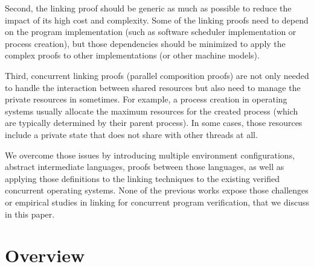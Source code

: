 Second,  
the linking proof should be generic as much as possible to reduce the impact of its high cost and complexity. 
Some of the linking proofs need to depend
on the program implementation (such as software scheduler implementation or process creation), 
but those dependencies should be minimized to apply the complex proofs to other implementations (or other machine models). 

Third, 
concurrent linking proofs (parallel composition proofs) 
are not only needed to handle the interaction between shared resources but also need to manage  the private resources in sometimes. 
For example, a process creation in operating systems usually allocate the maximum resources 
for the created process (which are typically determined by their parent process).
In some cases, those resources include a private state that does not share with other threads at all. 



We overcome those issues by introducing multiple environment configurations, abstract intermediate languages,
proofs between those languages,  
as well as applying those definitions to the linking techniques to the existing verified concurrent operating systems. 
None of the previous works expose those challenges or empirical studies in linking for concurrent program verification,
that we discuss in this paper.


\section{Overview}
\label{chapter:conlink:sec:overview}


